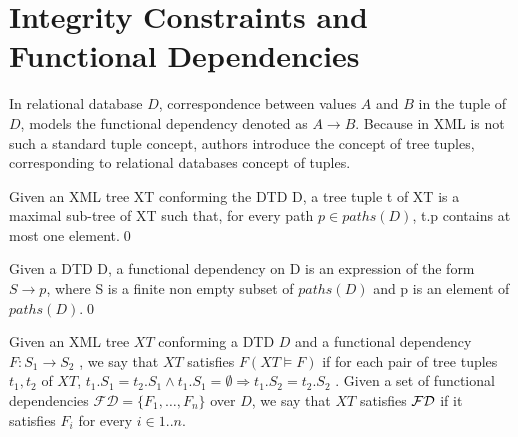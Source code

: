 \section{Integrity Constraints and Functional Dependencies}

In relational database $D$, correspondence between values $A$ and $B$ in the tuple of $D$, models the functional dependency denoted as $A \rightarrow B$. Because in XML is not such a standard tuple concept, authors introduce the concept of tree tuples, corresponding to relational databases concept of tuples.

\begin{define}
Given an XML tree XT conforming the DTD D, a tree tuple t of XT is a maximal sub-tree of XT such that, for every path $p \in paths(D)$, t.p contains at most one element.\qed
\end{define}

\begin{define}
Given a DTD D, a functional dependency on D is an expression of the form $S \rightarrow p$, where S is a finite non empty subset of $paths(D)$ and p is an element of $paths(D)$.\qed
\end{define}

Given an XML tree $XT$ conforming a DTD $D$ and a functional dependency $F : S_1 \rightarrow S_2$ , we say that $XT$ satisfies $F (XT \models F )$ if for each pair of tree tuples $t_1, t_2$ of $XT$, $t_1.S_1 = t_2.S_1 \land t_1.S_1 = \emptyset \Rightarrow t_1.S_2 = t_2.S_2$ . Given a set of functional dependencies $\mathcal{FD} = \{F_1 , \dots, F_n\}$ over $D$, we say that $XT$ satisfies $\cal FD$ if it satisfies $F_i$ for every $i \in 1..n$.

\begin{define}\label{treeSatisf}
\end{define}

\begin{define}\label{integConstr}
\end{define}
